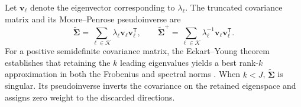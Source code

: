\noindent Let $\boldsymbol v_\ell$ denote the eigenvector corresponding to $\lambda_\ell$. The truncated covariance matrix and its Moore--Penrose pseudoinverse are
\begin{equation*}
\widetilde{\boldsymbol{\Sigma}}
=
\sum_{\ell\in\mathcal K}
\lambda_\ell\boldsymbol v_\ell\boldsymbol v_\ell^{\mathsf T},
\qquad
\widetilde{\boldsymbol{\Sigma}}^{+}
=
\sum_{\ell\in\mathcal K}
\lambda_\ell^{-1}\boldsymbol v_\ell\boldsymbol v_\ell^{\mathsf T}.
\end{equation*}
For a positive semidefinite covariance matrix, the Eckart--Young theorem establishes that retaining the $k$ leading eigenvalues yields a best rank-$k$ approximation in both the Frobenius and spectral norms \cite{eckart1936approximation}. When $k<J$, $\widetilde{\boldsymbol{\Sigma}}$ is singular. Its pseudoinverse inverts the covariance on the retained eigenspace and assigns zero weight to the discarded directions.
